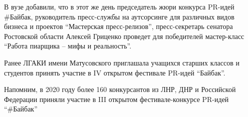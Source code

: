 В вузе добавили, что в этот же день председатель жюри конкурса PR-идей \#Байбак,
руководитель пресс-службы на аутсорсинге для различных видов бизнеса и проектов
\enquote{Мастерская пресс-релизов}, пресс-секретарь сенатора Ростовской области
Алексей Гриценко проведет для победителей мастер-класс \enquote{Работа пиарщика
– мифы и реальность}.

Ранее ЛГАКИ имени Матусовского приглашала учащихся старших классов и студентов
принять участие в IV открытом фестивале PR-идей \enquote{Байбак}.

Напомним, в 2020 году более 160 конкурсантов из ЛНР, ДНР и Российской Федерации
приняли участие в III открытом фестивале-конкурсе PR-идей \enquote{\#Байбак}
